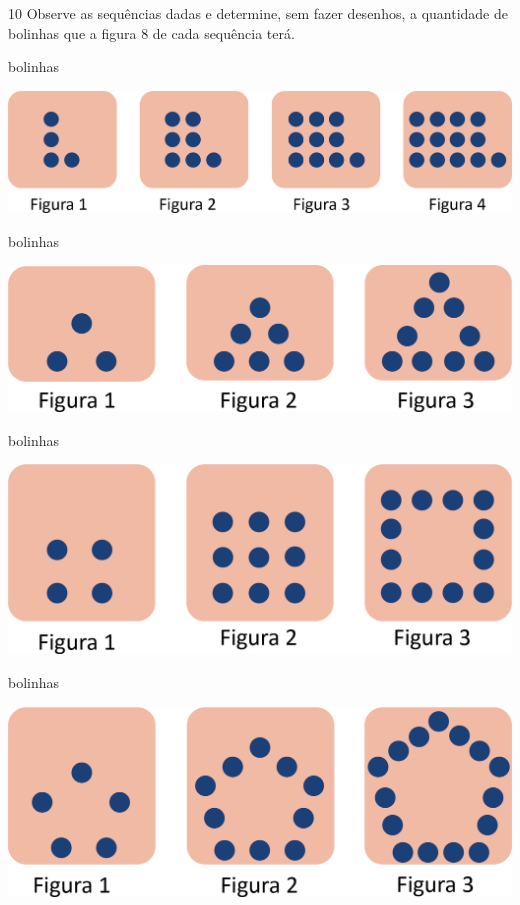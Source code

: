 \num{10} Observe as sequências dadas e determine, sem fazer desenhos, a
quantidade de bolinhas que a figura 8 de cada sequência terá.

\begin{escolha}
\item {} bolinhas

\includegraphics[width=.7\textwidth]{./media/image32.png}

\item {} bolinhas

\includegraphics[width=.7\textwidth]{./media/image33.png}

\item {} bolinhas

\includegraphics[width=.7\textwidth]{./media/image34.png}

\item {} bolinhas

\includegraphics[width=.7\textwidth]{./media/image35.png}
\end{escolha}

